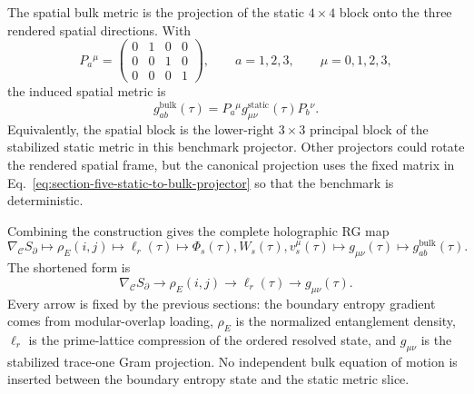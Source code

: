 \documentclass[11pt,letterpaper]{article}
\theoremstyle{plain}
\begin{document}
The spatial bulk metric is the projection of the static $4\times4$ block onto
the three rendered spatial directions.  With
\begin{equation}
\label{eq:section-five-static-to-bulk-projector}
 P_a{}^{\mu}
 =
 \begin{pmatrix}
 0&1&0&0\\
 0&0&1&0\\
 0&0&0&1
 \end{pmatrix},
 \qquad
 a=1,2,3,
 \qquad
 \mu=0,1,2,3,
\end{equation}
the induced spatial metric is
\begin{equation}
\label{eq:section-five-spatial-bulk-metric}
 g_{ab}^{\text{bulk}}(\tau)
 =
 P_a{}^{\mu}
 g_{\mu\nu}^{\text{static}}(\tau)
 P_b{}^{\nu}.
\end{equation}
Equivalently, the spatial block is the lower-right $3\times3$ principal block
of the stabilized static metric in this benchmark projector.  Other projectors
could rotate the rendered spatial frame, but the canonical projection uses the fixed matrix in
Eq.~\eqref{eq:section-five-static-to-bulk-projector} so that the benchmark is
deterministic.

Combining the construction gives the complete holographic RG map
\begin{equation}
\label{eq:section-five-complete-rg-map}
 \boxed{
 \nabla_{\mathcal C}S_{\partial}
 \longmapsto
 \rho_E(i,j)
 \longmapsto
 \ell_r(\tau)
 \longmapsto
 \Phi_s(\tau),W_s(\tau),v_s^{\mu}(\tau)
 \longmapsto
 g_{\mu\nu}(\tau)
 \longmapsto
 g_{ab}^{\text{bulk}}(\tau)
 }.
\end{equation}
The shortened form is
\begin{equation}
\label{eq:section-five-short-rg-map}
 \nabla_{\mathcal C}S_{\partial}
 \longrightarrow
 \rho_E(i,j)
 \longrightarrow
 \ell_r(\tau)
 \longrightarrow
 g_{\mu\nu}(\tau).
\end{equation}
Every arrow is fixed by the previous sections: the boundary entropy gradient
comes from modular-overlap loading, $\rho_E$ is the normalized entanglement
density, $\ell_r$ is the prime-lattice compression of the ordered resolved
state, and $g_{\mu\nu}$ is the stabilized trace-one Gram projection.  No
independent bulk equation of motion is inserted between the boundary entropy
state and the static metric slice.
\end{document}
